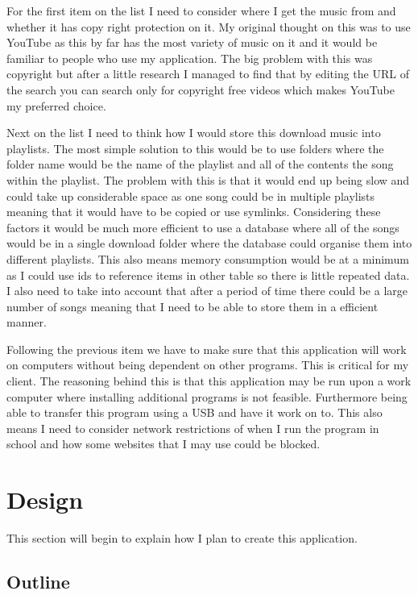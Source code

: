 \documentclass{article}
\begin{document}
For the first item on the list I need to consider where I get the music
from and whether it has copy right protection on it. My original thought
on this was to use YouTube as this by far has the most variety of music
on it and it would be familiar to people who use my application. The big
problem with this was copyright but after a little research I managed to
find that by editing the URL of the search you can search only for
copyright free videos which makes YouTube my preferred choice.

Next on the list I need to think how I would store this download music
into playlists. The most simple solution to this would be to use folders
where the folder name would be the name of the playlist and all of the
contents the song within the playlist. The problem with this is that it
would end up being slow and could take up considerable space as one song
could be in multiple playlists meaning that it would have to be copied
or use symlinks. Considering these factors it would be much more
efficient to use a database where all of the songs would be in a single
download folder where the database could organise them into different
playlists. This also means memory consumption would be at a minimum as I
could use ids to reference items in other table so there is little
repeated data. I also need to take into account that after a period of time
there could be a large number of songs meaning that I need to be able to store
them in a efficient manner.

Following the previous item we have to make sure that this application
will work on computers without being dependent on other programs. This
is critical for my client. The reasoning behind this is that this
application may be run upon a work computer where installing additional
programs is not feasible. Furthermore being able to transfer this
program using a USB and have it work on to. This also means I need to consider
network restrictions of when I run the program in school and how some websites
that I may use could be blocked.



\section{Design}\label{design}

This section will begin to explain how I plan to create this application.

\subsection{Outline}\label{outline}
\end{document}
